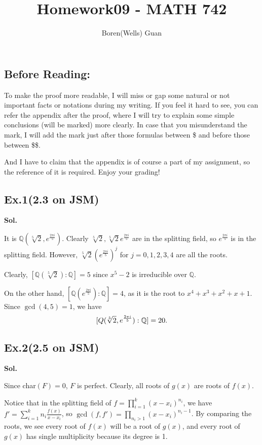 \documentclass[lang=en,11pt,a4paper,citestyle =authoryear]{elegantpaper}
\title{Homework09 - MATH 742}
\author{Boren(Wells) Guan}
\begin{document}
\maketitle

\subsection*{Before Reading:}\par
To make the proof more readable, I will miss or gap some natural or not important facts or notations during my writing. If you feel it hard to see, you can refer the appendix after the proof, where I will try to explain some simple conclusions (will be marked) more clearly. In case that you misunderstand the mark, I will add the mark just after those formulas between \$ and before those between \$\$.\par
And I have to claim that the appendix is of course a part of my assignment, so the reference of it is required. Enjoy your grading!

\subsection*{Ex.1(2.3 on JSM)}
\vspace{0.5em}
\textbf{Sol.} \par
    It is $\mathbb Q(\sqrt[5]{2},e^{\frac{2\pi i}{5}})$. Clearly $\sqrt[5]{2},\sqrt[5]{2}e^{\frac{2\pi i}{5}}$ are in the splitting field, so $e^{\frac{2\pi i}{5}}$ is in the splitting field. However, $\sqrt[5]{2}(e^{\frac{2\pi i}{5}})^j$ for $j=0,1,2,3,4$ are all the roots. 

Clearly, $[\mathbb Q(\sqrt[5]{2}):\mathbb Q]=5$ since $x^5-2$ is irreducible over $\mathbb Q$. 

On the other hand, $[\mathbb Q(e^{\frac{2\pi i}{5}}):\mathbb Q]=4$, as it is the root to $x^4+x^3+x^2+x+1$. Since $\gcd(4,5)=1$, we have $$[\mathbb \mathbb Q(\sqrt[5]{2},e^{\frac{2\pi i}{5}}):\mathbb Q]=20.$$
\par 
\vspace{0.5em}

\subsection*{Ex.2(2.5 on JSM)}
\textbf{Sol.} \par
Since char$(F)=0$, $F$ is perfect.  Clearly, all roots of $g(x)$ are roots of $f(x)$. 

Notice that in the splitting field of $f=\prod_{i=1}^k(x-x_i)^{n_i}$, we have $f'=\sum_{i=1}^k n_i\frac{f(x)}{x-x_i}$, so $\gcd(f,f')=\prod_{n_i>1}(x-x_i)^{n_i-1}$. By comparing the roots, we see every root of $f(x)$ will be a root of $g(x)$, and every root of $g(x)$ has single multiplicity because its degree is 1.
\par 
\vspace{0.5em}
\end{document}
